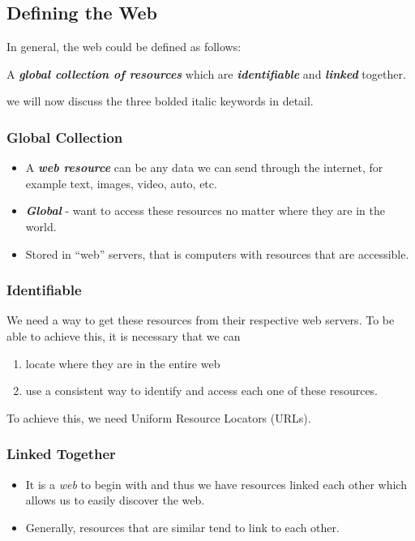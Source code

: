 \documentclass[10pt]{article}
\begin{document}
\subsection{Defining the Web} In general, the web could be defined as follows:
\begin{mdframed}
    A \textbf{\textit{global collection of resources}} which are \textit{\textbf{identifiable}} and \textit{\textbf{linked}} together. 
\end{mdframed}
we will now discuss the three bolded italic keywords in detail.

\subsubsection{Global Collection}
\begin{itemize}
    \item A \textit{\textbf{web resource}} can be any data we can send through the internet, for example text, images, video, auto, etc.
    \item \textit{\textbf{Global}} - want to access these resources no matter where they are in the world.
    \item Stored in ``web'' servers, that is computers with resources that are accessible. 
\end{itemize}

\subsubsection{Identifiable}
We need a way to get these resources from their respective web servers. To be able to achieve this, it is necessary that we can
\begin{enumerate}
    \item locate where they are in the entire web 
    \item use a consistent way to identify and access each one of these resources. 
\end{enumerate}
To achieve this, we need Uniform Resource Locators (URLs).

\subsubsection{Linked Together}
\begin{itemize}
    \item It is a \textit{web} to begin with and thus we have resources linked each other which allows us to easily discover the web.
    \item Generally, resources that are similar tend to link to each other. 
\end{itemize}
\end{document}
